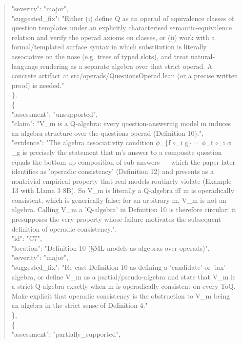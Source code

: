 \documentclass[11pt]{article}
\begin{document}
\begin{quote}
      "severity": "major",\\
      "suggested\_fix": "Either (i) define Q as an operad of equivalence classes of question templates under an explicitly characterised semantic-equivalence relation and verify the operad axioms on classes, or (ii) work with a formal/templated surface syntax in which substitution is literally associative on the nose (e.g. trees of typed slots), and treat natural-language rendering as a separate algebra over that strict operad. A concrete artifact at src/operads/QuestionsOperad.lean (or a precise written proof) is needed."\\
    \},\\
    \{\\
      "assessment": "unsupported",\\
      "claim": "V\_m is a Q-algebra: every question-answering model m induces an algebra structure over the questions operad (Definition 10).",\\
      "evidence": "The algebra associativity condition \ensuremath{\phi}\_\{f \ensuremath{\circ}\_i g\} = \ensuremath{\phi}\_f \ensuremath{\circ}\_i \ensuremath{\phi}\_g is precisely the statement that m's answer to a composite question equals the bottom-up composition of sub-answers --- which the paper later identifies as 'operadic consistency' (Definition 12) and presents as a nontrivial empirical property that real models routinely violate (Example 13 with Llama 3 8B). So V\_m is literally a Q-algebra iff m is operadically consistent, which is generically false; for an arbitrary m, V\_m is not an algebra. Calling V\_m a 'Q-algebra' in Definition 10 is therefore circular: it presupposes the very property whose failure motivates the subsequent definition of operadic consistency.",\\
      "id": "C7",\\
      "location": "Definition 10 (§ML models as algebras over operads)",\\
      "severity": "major",\\
      "suggested\_fix": "Re-cast Definition 10 as defining a 'candidate' or 'lax' algebra, or define V\_m as a partial/pseudo-algebra and state that V\_m is a strict Q-algebra exactly when m is operadically consistent on every ToQ. Make explicit that operadic consistency is the obstruction to V\_m being an algebra in the strict sense of Definition 4."\\
    \},\\
    \{\\
      "assessment": "partially\_supported",\\

\end{quote}
\end{document}
